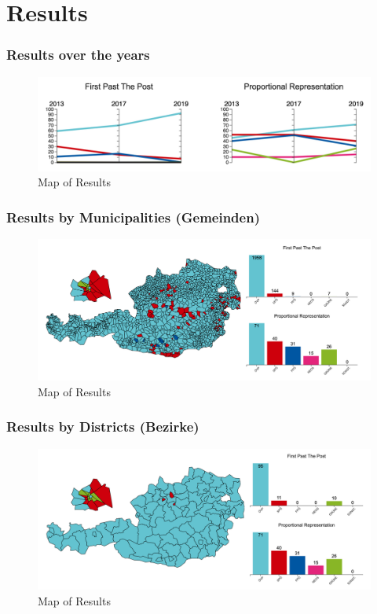 \documentclass{beamer}
\begin{document}
\section{Results} 

\begin{frame}
\frametitle{Results over the years}
\begin{figure}[h]
  \centering
  \includegraphics[width=0.9\linewidth]{../Screenshot/paralellCoordinates.png} %
  \caption{\label{fig:mapOfResults} Map of Results}
\end{figure}
\end{frame}


\begin{frame}
\frametitle{Results by Municipalities (Gemeinden)}
\begin{figure}[h]
  \centering
  \includegraphics[width=0.9\linewidth]{../Screenshot/mapbyGemeinden.png} %
  \caption{\label{fig:mapOfResults} Map of Results}
\end{figure}
\end{frame}

\begin{frame}
\frametitle{Results by Districts (Bezirke)}
\begin{figure}[h]
  \centering
  \includegraphics[width=0.9\linewidth]{../Screenshot/mapbyBezirken.png}
  \caption{\label{fig:mapOfResults} Map of Results}
\end{figure}
\end{frame}
\end{document}

